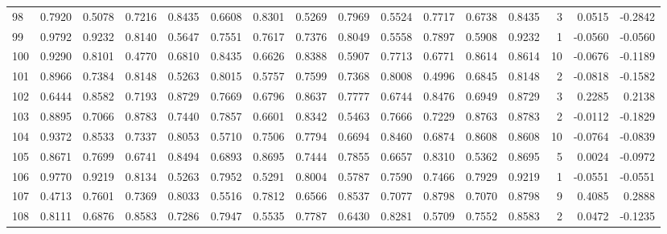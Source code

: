 \begin{tabular}{lrrrrrrrrrrrrrrr}
98  &      0.7920 &  0.5078 &  0.7216 &  0.8435 &  0.6608 &  0.8301 &  0.5269 &  0.7969 &  0.5524 &  0.7717 &   0.6738 &     0.8435 &      3 &                    0.0515 &                    -0.2842 \\
99  &      0.9792 &  0.9232 &  0.8140 &  0.5647 &  0.7551 &  0.7617 &  0.7376 &  0.8049 &  0.5558 &  0.7897 &   0.5908 &     0.9232 &      1 &                   -0.0560 &                    -0.0560 \\
100 &      0.9290 &  0.8101 &  0.4770 &  0.6810 &  0.8435 &  0.6626 &  0.8388 &  0.5907 &  0.7713 &  0.6771 &   0.8614 &     0.8614 &     10 &                   -0.0676 &                    -0.1189 \\
101 &      0.8966 &  0.7384 &  0.8148 &  0.5263 &  0.8015 &  0.5757 &  0.7599 &  0.7368 &  0.8008 &  0.4996 &   0.6845 &     0.8148 &      2 &                   -0.0818 &                    -0.1582 \\
102 &      0.6444 &  0.8582 &  0.7193 &  0.8729 &  0.7669 &  0.6796 &  0.8637 &  0.7777 &  0.6744 &  0.8476 &   0.6949 &     0.8729 &      3 &                    0.2285 &                     0.2138 \\
103 &      0.8895 &  0.7066 &  0.8783 &  0.7440 &  0.7857 &  0.6601 &  0.8342 &  0.5463 &  0.7666 &  0.7229 &   0.8763 &     0.8783 &      2 &                   -0.0112 &                    -0.1829 \\
104 &      0.9372 &  0.8533 &  0.7337 &  0.8053 &  0.5710 &  0.7506 &  0.7794 &  0.6694 &  0.8460 &  0.6874 &   0.8608 &     0.8608 &     10 &                   -0.0764 &                    -0.0839 \\
105 &      0.8671 &  0.7699 &  0.6741 &  0.8494 &  0.6893 &  0.8695 &  0.7444 &  0.7855 &  0.6657 &  0.8310 &   0.5362 &     0.8695 &      5 &                    0.0024 &                    -0.0972 \\
106 &      0.9770 &  0.9219 &  0.8134 &  0.5263 &  0.7952 &  0.5291 &  0.8004 &  0.5787 &  0.7590 &  0.7466 &   0.7929 &     0.9219 &      1 &                   -0.0551 &                    -0.0551 \\
107 &      0.4713 &  0.7601 &  0.7369 &  0.8033 &  0.5516 &  0.7812 &  0.6566 &  0.8537 &  0.7077 &  0.8798 &   0.7070 &     0.8798 &      9 &                    0.4085 &                     0.2888 \\
108 &      0.8111 &  0.6876 &  0.8583 &  0.7286 &  0.7947 &  0.5535 &  0.7787 &  0.6430 &  0.8281 &  0.5709 &   0.7552 &     0.8583 &      2 &                    0.0472 &                    -0.1235 \\

\end{tabular}
